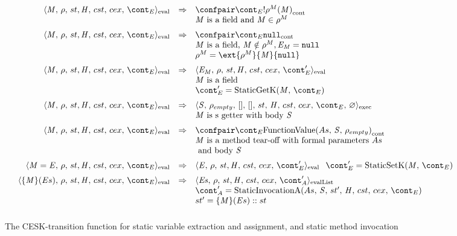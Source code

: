 \documentclass{article}
\newcounter{rowcount}[figure]
\newcounter{figurecount}
\newcommand{\myrowcount}{\refstepcounter{rowcount}\thesubsection.\thefigurecount.\therowcount}
\newcommand{\labeledrow}[1]{\myrowcount\label{#1}}
\renewcommand{\emptyset}{\varnothing}
\begin{document}
%
\begin{figure}[Htp]
	$
	\begin{array}{lrcl}
		\evalcesktrans
			{\evalconf{\StaticGet{\membermeta}}{\env}{\strace}{\cstrace}{\cex}{\econt}}
			{\contconf{\econt}{\deref{\env^{M}(\membermeta)}}}
			{\\&&&\membermeta\textrm{ is a field and } \membermeta \in \env^{M}}

		\evalcesktrans
			{\evalconf{\StaticGet{\membermeta}}{\env}{\strace}{\cstrace}{\cex}{\econt}}
			{\contconf{\econt}{\tt{null}}}
			{\\&&&\membermeta\textrm{ is a field, } \membermeta \notin \env^{M}, \expressionmeta_{\membermeta} = \tt{null}
			\\&&&\env^{M} = \ext{\env^{M}}{\membermeta}{\tt{null}}}

		\evalcesktrans
			{\evalconf{\StaticGet{\membermeta}}{\env}{\strace}{\cstrace}{\cex}{\econt}}
			{\evalconf{\expressionmeta_{\membermeta}}{\env}{\strace}{\cstrace}{\cex}{\econt'}}
			{\\&&&\membermeta\textrm{ is a field}
			\\&&&\econt' = \StaticGetK}

		\evalcesktrans
			{\evalconf{\StaticGet{\membermeta}}{\env}{\strace}{\cstrace}{\cex}{\econt}}
			{\execconf{\stmt}{\env_{empty}}{[]}{[]}{\handler}{\cstrace}{\cex}{\econt}{\emptyset}}
			{\\&&&\membermeta\textrm{ is s getter with body }\stmt}

		\evalcesktrans
			{\evalconf{\StaticGet{\membermeta}}{\env}{\strace}{\cstrace}{\cex}{\econt}}
			{\contconf{\econt}{\funval{\formals}{\stmt}{\env_{empty}}}}
			{\\&&&\membermeta\textrm{ is a method tear-off with formal parameters }\formals
			\\&&&\textrm{ and body }\stmt}

		\evalcesktrans
			{\evalconf{\StaticSet{\membermeta}{\expressionmeta}}{\env}{\strace}{\cstrace}{\cex}{\econt}}
			{\evalconf{\expressionmeta}{\env}{\strace}{\cstrace}{\cex}{\econt'}}
			{\econt' = \StaticSetK}

		\evalcesktrans
			{\evalconf{\StaticInvocation{\{\membermeta\}}{\expressionsmeta}}{\env}{\strace}{\cstrace}{\cex}{\econt}}
			{\evallistconf{\exprs}{\env}{\strace}{\cstrace}{\cex}{\acont'}}
			{\\&&&\acont' = \StaticInvA{\formals}{\stmt}{\strace'}{\econt}
			\\&&&\strace' = \StaticInvocation{\{\membermeta\}}{\expressionsmeta}::\strace}
	\end{array}
	$
	\caption{The CESK-transition function for static variable extraction and assignment, and static method invocation}
	\label{table:static-evalconfigs}
\end{figure}
\end{document}
